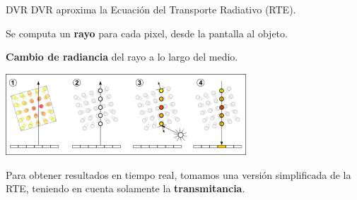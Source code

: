 \documentclass[spanish,unknownkeysallowed]{beamer}
\begin{document}
\begin{frame}{DVR}
DVR aproxima la Ecuación del Transporte Radiativo (RTE).

Se computa un \textbf{rayo} para cada pixel, desde la pantalla al objeto.

\textbf{Cambio de radiancia} del rayo a lo largo del medio.


\centerline{\includegraphics[width=9cm]{../figures/dvr}}

Para obtener resultados en tiempo real, tomamos una versión simplificada de la RTE, teniendo en cuenta solamente la \textbf{transmitancia}.
\end{frame}
















\end{document}
